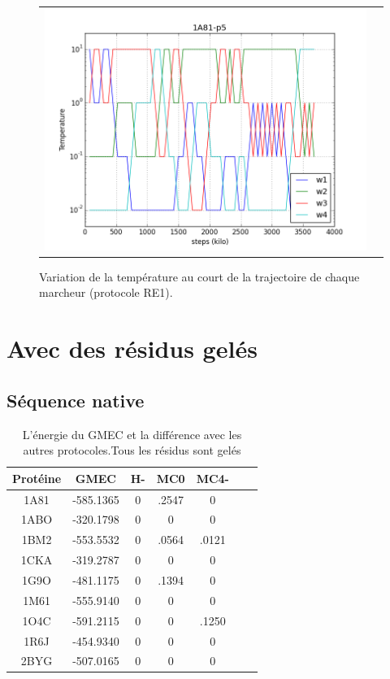 \documentclass[a4paper,12pt]{article}
\begin{document}
   \begin{figure}[h]
     \centering
     \begin{tabular}{cc}
       \includegraphics[width=12cm]{image/1A81-p5-T_traj.png} &
     \end{tabular}
     
     \caption{Variation de la température au court de la trajectoire de chaque marcheur (protocole RE1).}
     \label{TRAJ_T_RE1}
   \end{figure}

   \section{Avec des résidus gelés}
 
   \subsection{Séquence native}


    \begin{table}[h]
      \centering

      \begin{tabular}{|c|c|c|c|c|c|c|}

        \hline
        Protéine & GMEC & H- & MC0 & MC4- \\
        \hline
        1A81 & -585.1365 & 0 & .2547 & 0 \\
        1ABO & -320.1798 & 0 & 0 & 0 \\
        1BM2 & -553.5532 & 0 & .0564 & .0121 \\
        1CKA & -319.2787 & 0 & 0 & 0 \\
        1G9O & -481.1175 & 0 & .1394 & 0 \\
        1M61 & -555.9140 & 0 & 0 & 0 \\
        1O4C & -591.2115 & 0 & 0 & .1250 \\
        1R6J & -454.9340 & 0 & 0 & 0 \\
        2BYG & -507.0165 & 0 & 0 & 0 \\        
        \hline


      \end{tabular}      
      \caption{L’énergie du GMEC et la différence avec les autres protocoles.Tous les résidus sont gelés}
      \label{tab_best_ener_no_active}      
    \end{table}
\end{document}
